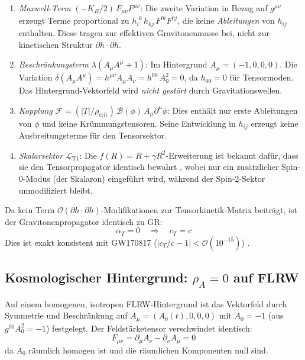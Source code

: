\documentclass[aps,prd,twocolumn,superscriptaddress,nofootinbib]{revtex4-2}
\begin{document}
\begin{enumerate}
\item \textit{Maxwell-Term} $(-K_B/2)\,F_{\mu\nu}F^{\mu\nu}$: Die zweite Variation in Bezug auf $g^{\mu\nu}$ erzeugt Terme proportional zu $h_{i}^{\phantom{i}k}\,h_{kj}\,F^{0i}F^{0j}$, die keine \textit{Ableitungen} von $h_{ij}$ enthalten. Diese tragen zur effektiven Gravitonenmasse bei, nicht zur kinetischen Struktur $\partial h \cdot \partial h$.

\item \textit{Beschr\"ankungsterm} $\lambda(A_\mu A^\mu + 1)$: Im Hintergrund $A_\mu = (-1, 0, 0, 0)$. Die Variation $\delta(A_\mu A^\mu) = h^{\mu\nu}A_\mu A_\nu = h^{00}\,A_0^2 = 0$, da $h_{00} = 0$ f\"ur Tensormoden. Das Hintergrund-Vektorfeld wird \textit{nicht gest\"ort} durch Gravitationswellen.

\item \textit{Kopplung} $\mathcal{F} = (|T|/\rho_{\mathrm{crit}})\,\mathcal{B}(\phi)\,A_\mu\partial^\mu\phi$: Dies enth\"alt nur erste Ableitungen von $\phi$ und keine Kr\"ummungstensoren. Seine Entwicklung in $h_{ij}$ erzeugt keine Ausbreitungsterme f\"ur den Tensorsektor.

\item \textit{Skalarsektor} $\mathcal{L}_{\mathrm{T1}}$: Die $f(R) = R + \gamma R^2$-Erweiterung ist bekannt daf\"ur, dass sie den Tensorpropagator identisch bewahrt \cite{Starobinsky1980}, wobei nur ein zus\"atzlicher Spin-0-Modus (der Skalaron) eingef\"uhrt wird, w\"ahrend der Spin-2-Sektor unmodifiziert bleibt.
\end{enumerate}

Da kein Term $\mathcal{O}(\partial h \cdot \partial h)$-Modifikationen zur Tensorkinetik-Matrix beitr\"agt, ist der Gravitonenpropagator identisch zu GR:
\begin{equation}
\alpha_T = 0 \quad\Longrightarrow\quad c_T = c
\label{eq:alpha_T}
\end{equation}
Dies ist exakt konsistent mit GW170817 ($|c_T/c - 1| < \mathcal{O}(10^{-15})$) \cite{Abbott2017}.

\subsection{Kosmologischer Hintergrund: $\rho_A = 0$ auf FLRW}
\label{sec:rho_A}

Auf einem homogenen, isotropen FLRW-Hintergrund ist das Vektorfeld durch Symmetrie und Beschr\"ankung auf $A_\mu = (A_0(t), 0, 0, 0)$ mit $A_0 = -1$ (aus $g^{00}A_0^2 = -1$) festgelegt. Der Feldst\"arketensor verschwindet identisch:
\begin{equation}
F_{\mu\nu} = \partial_\mu A_\nu - \partial_\nu A_\mu = 0
\end{equation}
da $A_0$ r\"aumlich homogen ist und die r\"aumlichen Komponenten null sind.
\end{document}
